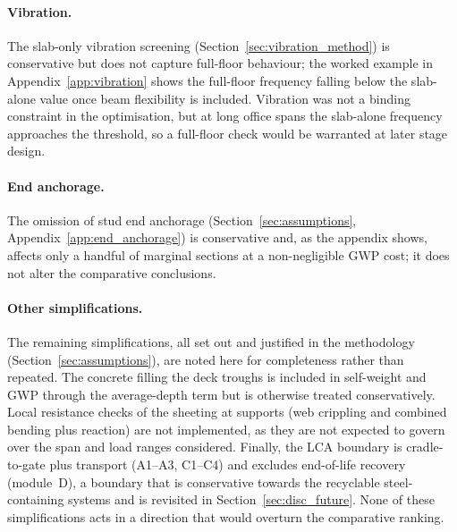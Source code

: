 \paragraph{Vibration.} The slab-only vibration screening (Section~\ref{sec:vibration_method}) is conservative but does not capture full-floor behaviour; the worked example in Appendix~\ref{app:vibration} shows the full-floor frequency falling below the slab-alone value once beam flexibility is included. Vibration was not a binding constraint in the optimisation, but at long office spans the slab-alone frequency approaches the threshold, so a full-floor check would be warranted at later stage design.

\paragraph{End anchorage.} The omission of stud end anchorage (Section~\ref{sec:assumptions}, Appendix~\ref{app:end_anchorage}) is conservative and, as the appendix shows, affects only a handful of marginal sections at a non-negligible GWP cost; it does not alter the comparative conclusions.

\paragraph{Other simplifications.} The remaining simplifications, all set out and justified in the methodology (Section~\ref{sec:assumptions}), are noted here for completeness rather than repeated. The concrete filling the deck troughs is included in self-weight and GWP through the average-depth term but is otherwise treated conservatively. Local resistance checks of the sheeting at supports (web crippling and combined bending plus reaction) are not implemented, as they are not expected to govern over the span and load ranges considered. Finally, the LCA boundary is cradle-to-gate plus transport (A1--A3, C1--C4) and excludes end-of-life recovery (module~D), a boundary that is conservative towards the recyclable steel-containing systems and is revisited in Section~\ref{sec:disc_future}. None of these simplifications acts in a direction that would overturn the comparative ranking.

